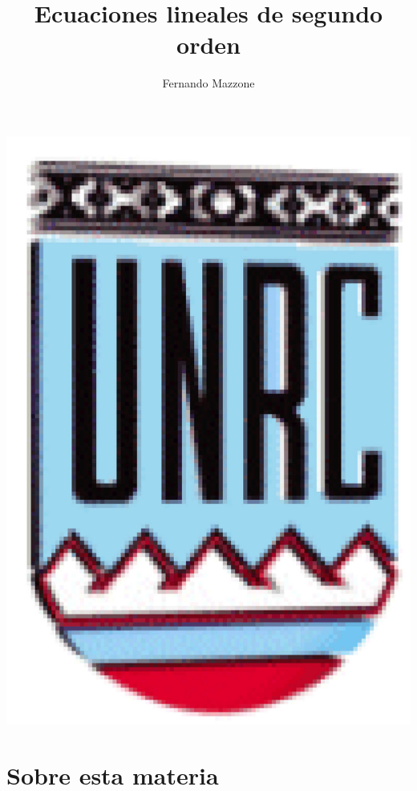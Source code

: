 \documentclass[handout,hyperref={colorlinks=true}]{beamer}
\title[Ecuaciones lineales de segundo orden] %
{%
 Ecuaciones lineales de segundo orden
}
\author[] %
{Fernando Mazzone}
\institute[Depto de Matemática] %
{
 Depto de Matemática\\
Facultad de Ciencias Exactas Físico-Químicas y Naturales\\
Universidad Nacional de Río Cuarto}
\begin{document}
\begin{frame}
  \maketitle
  \begin{center}
   \includegraphics[scale=0.2]{imagenes/unrc.jpg}
   \end{center}
\end{frame}















\section{Sobre esta materia}
\end{document}
